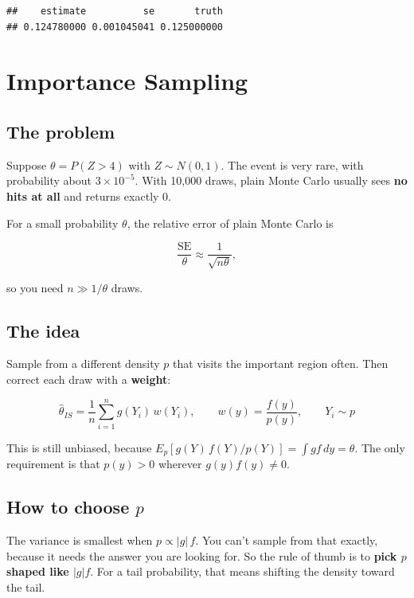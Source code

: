 \documentclass[
]{article}
\begin{document}
\begin{verbatim}
##    estimate          se       truth 
## 0.124780000 0.001045041 0.125000000
\end{verbatim}

\section{Importance Sampling}\label{importance-sampling}

\subsection{The problem}\label{the-problem}

Suppose \(\theta = P(Z > 4)\) with \(Z \sim N(0,1)\). The event is very
rare, with probability about \(3 \times 10^{-5}\). With 10,000 draws,
plain Monte Carlo usually sees \textbf{no hits at all} and returns
exactly 0.

For a small probability \(\theta\), the relative error of plain Monte
Carlo is

\[
\frac{\text{SE}}{\theta} \approx \frac{1}{\sqrt{n\theta}},
\]

so you need \(n \gg 1/\theta\) draws.

\subsection{The idea}\label{the-idea-1}

Sample from a different density \(p\) that visits the important region
often. Then correct each draw with a \textbf{weight}:

\[
\hat\theta_{IS} = \frac{1}{n}\sum_{i=1}^n g(Y_i)\,w(Y_i),
\qquad w(y)=\frac{f(y)}{p(y)}, \qquad Y_i \sim p
\]

This is still unbiased, because
\(E_p[g(Y)\,f(Y)/p(Y)] = \int g f\,dy = \theta\). The only requirement
is that \(p(y) > 0\) wherever \(g(y)f(y) \neq 0\).

\subsection{\texorpdfstring{How to choose
\(p\)}{How to choose p}}\label{how-to-choose-p}

The variance is smallest when \(p \propto |g|\,f\). You can't sample
from that exactly, because it needs the answer you are looking for. So
the rule of thumb is to \textbf{pick \(p\) shaped like \(|g|f\)}. For a
tail probability, that means shifting the density toward the tail.
\end{document}
